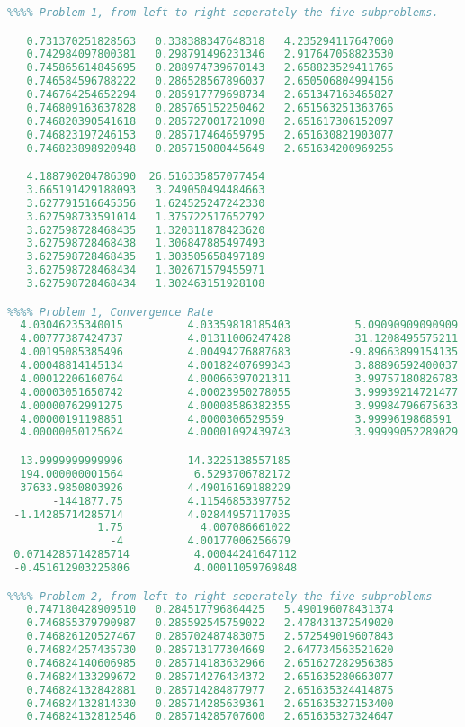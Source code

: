 \begin{lstlisting}[language = MATLAB]
%%%% RESULTS %%%%
%%%% Problem 1, from left to right seperately the five subproblems.

   0.731370251828563   0.338388347648318   4.235294117647060
   0.742984097800381   0.298791496231346   2.917647058823530
   0.745865614845695   0.288974739670143   2.658823529411765
   0.746584596788222   0.286528567896037   2.650506804994156
   0.746764254652294   0.285917779698734   2.651347163465827
   0.746809163637828   0.285765152250462   2.651563251363765
   0.746820390541618   0.285727001721098   2.651617306152097
   0.746823197246153   0.285717464659795   2.651630821903077
   0.746823898920948   0.285715080445649   2.651634200969255

   4.188790204786390  26.516335857077454
   3.665191429188093   3.249050494484663
   3.627791516645356   1.624525247242330
   3.627598733591014   1.375722517652792
   3.627598728468435   1.320311878423620
   3.627598728468438   1.306847885497493
   3.627598728468435   1.303505658497189
   3.627598728468434   1.302671579455971
   3.627598728468434   1.302463151928108

%%%% Problem 1, Convergence Rate
  4.03046235340015          4.03359818185403          5.09090909090909
  4.00777387424737          4.01311006247428          31.1208495575211
  4.00195085385496          4.00494276887683         -9.89663899154135
  4.00048814145134          4.00182407699343          3.88896592400037
  4.00012206160764          4.00066397021311          3.99757180826783
  4.00003051650742          4.00023950278055          3.99939214721477
  4.00000762991275          4.00008586382355          3.99984796675633
  4.00000191198851          4.0000306529559           3.9999619868591
  4.00000050125624          4.00001092439743          3.99999052289029

  13.9999999999996          14.3225138557185
  194.000000001564           6.5293706782172
  37633.9850803926          4.49016169188229
       -1441877.75          4.11546853397752
 -1.14285714285714          4.02844957117035
              1.75            4.007086661022
                -4          4.00177006256679
 0.0714285714285714          4.00044241647112
 -0.451612903225806          4.00011059769848

%%%% Problem 2, from left to right seperately the five subproblems
   0.747180428909510   0.284517796864425   5.490196078431374
   0.746855379790987   0.285592545759022   2.478431372549020
   0.746826120527467   0.285702487483075   2.572549019607843
   0.746824257435730   0.285713177304669   2.647734563521620
   0.746824140606985   0.285714183632966   2.651627282956385
   0.746824133299672   0.285714276434372   2.651635280663077
   0.746824132842881   0.285714284877977   2.651635324414875
   0.746824132814330   0.285714285639361   2.651635327153400
   0.746824132812546   0.285714285707600   2.651635327324647


\end{lstlisting}
